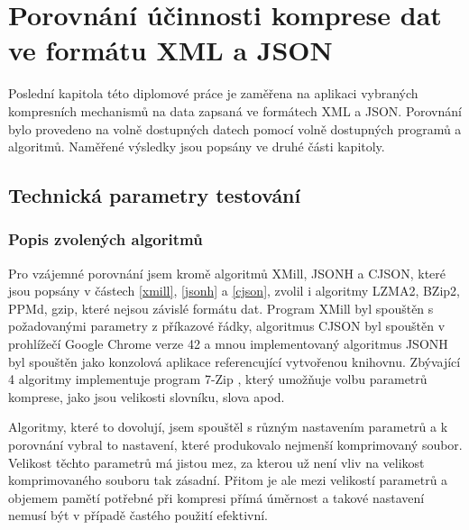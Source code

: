 \chapter{Porovnání účinnosti komprese dat ve formátu XML a JSON}
Poslední kapitola této diplomové práce je zaměřena na aplikaci vybraných kompresních mechanismů na data zapsaná ve formátech XML a JSON. Porovnání bylo provedeno na volně dostupných datech pomocí volně dostupných programů a algoritmů. Naměřené výsledky jsou popsány ve druhé části kapitoly.

\section{Technická parametry testování}

\subsection{Popis zvolených algoritmů}
Pro vzájemné porovnání jsem kromě algoritmů XMill, JSONH a CJSON, které jsou popsány v částech \ref{xmill}, \ref{jsonh} a \ref{cjson}, zvolil i algoritmy LZMA2, BZip2, PPMd, gzip, které nejsou závislé formátu dat. Program XMill byl spouštěn s požadovanými parametry z příkazové řádky, algoritmus CJSON byl spouštěn v prohlížečí Google Chrome verze 42 a mnou implementovaný algoritmus JSONH byl spouštěn jako konzolová aplikace referencující vytvořenou knihovnu. Zbývající 4 algoritmy implementuje program 7-Zip \cite{7zip}, který umožňuje volbu parametrů komprese, jako jsou velikosti slovníku, slova apod.

Algoritmy, které to dovolují, jsem spouštěl s různým nastavením parametrů a k porovnání vybral to nastavení, které produkovalo nejmenší komprimovaný soubor. Velikost těchto parametrů má jistou mez, za kterou už není vliv na velikost komprimovaného souboru tak zásadní. Přitom je ale mezi velikostí parametrů a objemem pamětí potřebné při kompresi přímá úměrnost a takové nastavení nemusí být v případě častého použití efektivní.

